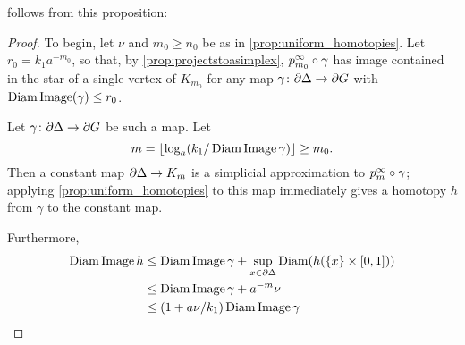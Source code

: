 \documentclass[a4paper]{article}
\begin{document}
 follows from this proposition:

\ddagimpliesLCd*

\begin{proof}
  To begin, let $\nu$ and $m_0 \geq n_0$ be as in
  \cref{prop:uniform_homotopies}. Let $r_0 =
  k_1a^{-m_0}$, so that, by \cref{prop:projectstoasimplex},
  $p^\infty_{m_0}\circ\gamma$ has image contained in the star of a single
  vertex of $K_{m_0}$ for any map $\gamma\colon\partial\Delta\to\partial
  G$ with $\operatorname{Diam}\operatorname{Image}(\gamma)\leq r_0$.

  Let $\gamma\colon\partial\Delta\to\partial G$ be such a map. Let 
  \begin{equation*}
    m = \lfloor\log_a(k_1/\operatorname{Diam}\operatorname{Image}\gamma)\rfloor \geq m_0.
  \end{equation*}
  Then a constant map $\partial\Delta \to K_m$ is a simplicial approximation
  to $p^\infty_m\circ\gamma$; applying \cref{prop:uniform_homotopies} to
  this map immediately gives a homotopy $h$ from $\gamma$ to the constant map.

  Furthermore,
  \begin{align*}
    \operatorname{Diam}\operatorname{Image} h &\leq \operatorname{Diam}\operatorname{Image}\gamma + \sup_{x \in\partial\Delta}
                                    \operatorname{Diam}(h(\{x\} \times [0,1])) \\
                  &\leq \operatorname{Diam}\operatorname{Image}\gamma + a^{-m} \nu \\
                  &\leq (1 + a\nu/k_1) \operatorname{Diam}\operatorname{Image}\gamma \qedhere
  \end{align*}
\end{proof}


\end{document}
